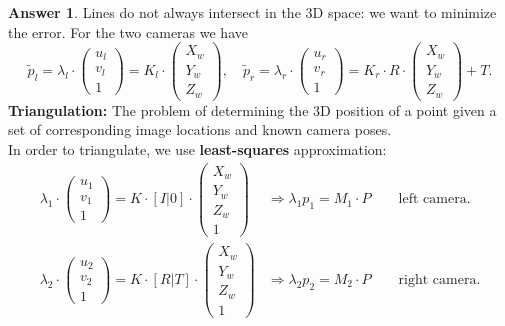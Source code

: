 \documentclass[a4paper,12 pt]{article}
\theoremstyle{definition}
\theoremstyle{remark}
\theoremstyle{definition}
\theoremstyle{definition}
\theoremstyle{definition}
\theoremstyle{definition}
\theoremstyle{remark}
\theoremstyle{remark}
\theoremstyle{definition}
\theoremstyle{definition}
\newtheorem*{answer}{Answer}
\begin{document}
\begin{enumerate}
\begin{enumerate}
\begin{answer}
 Lines do not always intersect in the 3D space: we want to minimize the error. For the two cameras we have
\begin{equation}
\tilde{p}_l=\lambda_l\cdot \begin{pmatrix}
 u_l\\
 v_l\\
 1
 \end{pmatrix}=K_l\cdot \begin{pmatrix}
 X_w\\
 Y_w\\
 Z_w
 \end{pmatrix}, \quad \tilde{p}_r=\lambda_r\cdot \begin{pmatrix}
 u_r\\
 v_r\\
 1
 \end{pmatrix}=K_r\cdot R\cdot \begin{pmatrix}
 X_w\\
 Y_w\\
 Z_w
 \end{pmatrix}+T. 
\end{equation}
\textbf{Triangulation:} The problem of determining the 3D position of a point given a set of corresponding image locations and known camera poses.\\ In order to triangulate, we use \textbf{least-squares} approximation:
\begin{equation}
\begin{split}
\lambda_1\cdot \begin{pmatrix}
 u_1\\
 v_1\\
 1
 \end{pmatrix}=K\cdot [I|0]\cdot \begin{pmatrix}
 X_w\\
 Y_w\\
 Z_w\\
 1
 \end{pmatrix}&\Rightarrow \lambda_1p_1=M_1\cdot P \qquad \text{left camera}. \\
 \lambda_2\cdot \begin{pmatrix}
 u_2\\
 v_2\\
 1
 \end{pmatrix}=K\cdot [R|T]\cdot \begin{pmatrix}
 X_w\\
 Y_w\\
 Z_w\\
 1
 \end{pmatrix}&\Rightarrow \lambda_2p_2=M_2\cdot P \qquad \text{right camera}.

\end{split}
\end{equation}
\end{answer}
\end{enumerate}
\end{enumerate}
\end{document}
